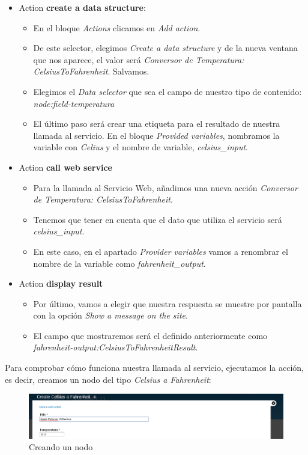 \begin{itemize}
  \item Action \textbf{create a data structure}:
  \begin{itemize}
    \item En el bloque \textit{Actions} clicamos en \textit{Add action}.
    \item De este selector, elegimos \textit{Create a data structure} y de la nueva ventana que nos aparece, 
    	el valor será \textit{Conversor de Temperatura: CelsiusToFahrenheit}. Salvamos.
  	\item Elegimos el \textit{Data selector} que sea el campo de nuestro tipo de contenido: \textit{node:field-temperatura}
	\item El último paso será crear una etiqueta para el resultado de nuestra llamada al servicio. En el 
    	 bloque \textit{Provided variables}, nombramos la variable con \textit{Celius} y el nombre de variable, \textit{celsius\_input}.
    \end{itemize}
  \item Action \textbf{call web service}
  \begin{itemize}
    \item Para la llamada al Servicio Web, añadimos una nueva acción \textit{Conversor de Temperatura: CelsiusToFahrenheit}.
    \item Tenemos que tener en cuenta que el dato que utiliza el servicio será \textit{celsius\_input}. 
    \item En este caso, en el apartado \textit{Provider variables} vamos a renombrar el nombre de la variable como 
    \textit{fahrenheit\_output}.
  \end{itemize}
  \item Action \textbf{display result}
  \begin{itemize}
    \item Por último, vamos a elegir que nuestra respuesta se muestre por pantalla con la opción \textit{Show a message on the site}.
    \item El campo que mostraremos será el definido anteriormente como \textit{fahrenheit-output:CelsiusToFahrenheitResult}.
  \end{itemize}
\end{itemize}

Para comprobar cómo funciona nuestra llamada al servicio, ejecutamos la acción, es decir, creamos un nodo del 
tipo \textit{Celsius a Fahrenheit}:

\begin{figure}[h]
  \centering
    \includegraphics[width=1\textwidth]{Assets/Soap/Imagenes/crear_nodo.png}
  \caption{Creando un nodo}
\end{figure}

